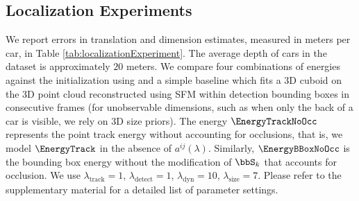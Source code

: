 

\subsection{Localization Experiments}
We report errors in translation and dimension estimates, measured in meters per car, in Table \ref{tab:localizationExperiment}. The average depth of cars in the dataset is approximately $20$ meters. We compare four combinations of energies against the initialization using \cite{Song_Chandraker_2014} and a simple baseline which fits a 3D cuboid on the 3D point cloud reconstructed using SFM within detection bounding boxes in consecutive frames (for unobservable dimensions, such as when only the back of a car is visible, we rely on 3D size priors). The energy $\EnergyTrackNoOcc$ represents the point track energy without accounting for occlusions, that is, we model $\EnergyTrack$ in the absence of $a^{ij} (\lambda)$. Similarly, $\EnergyBBoxNoOcc$ is the bounding box energy without the modification of $\bbS_k$ that accounts for occlusion. We use $\lambda_{\text{track}} = 1$, $\lambda_{\text{detect}} = 1$, $\lambda_{\text{dyn}} = 10$, $\lambda_{\text{size}} = 7$. Please refer to the supplementary material for a detailed list of parameter settings.

